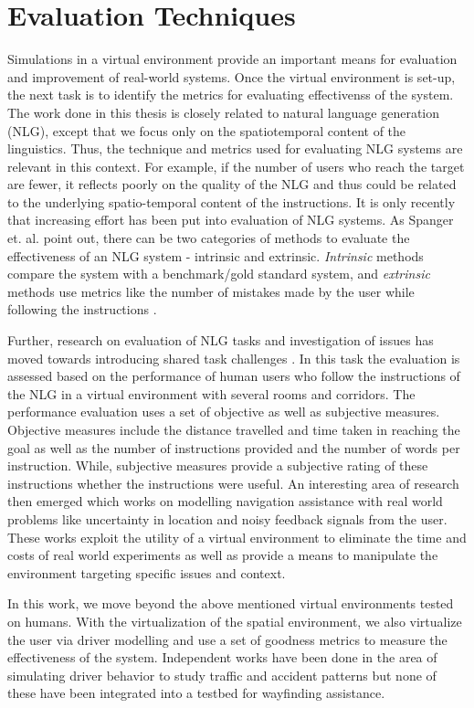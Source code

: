 \documentclass{iitkthesis}
\begin{document}
 \section{Evaluation Techniques}
Simulations in a virtual environment provide an important means for 
evaluation and improvement of real-world systems. Once the virtual 
environment is set-up, the next task is to identify the metrics for 
evaluating effectivenss of the system. The work done in this thesis is 
closely related to natural language generation (NLG), except that we focus 
only on the spatiotemporal content of the linguistics. Thus, the 
technique and metrics used for evaluating NLG systems are relevant in 
this context. For example, if the number of users who reach the target 
are fewer, it reflects poorly on the quality of the NLG and thus 
could be related to the underlying spatio-temporal content of the 
instructions. It is only recently that increasing effort has 
been put into evaluation of NLG systems. As Spanger et. al. \cite{spanger} 
point out, there can be two categories of methods to evaluate the 
effectiveness of an NLG system - intrinsic and extrinsic. \textit{
Intrinsic} methods compare the system with a benchmark/gold standard 
system, and \textit{extrinsic} methods use metrics like the number of 
mistakes made by the user while following the instructions \cite{young}. 

Further, research on evaluation of NLG tasks and investigation of issues 
has moved towards introducing shared task challenges \cite{give}. In this 
task the evaluation is assessed based on the performance of human users 
who follow the instructions of the NLG in a virtual environment with 
several rooms and corridors. The performance evaluation uses a set of 
objective as well as subjective measures. Objective measures include the 
distance travelled and time taken in reaching the goal as well as the 
number of instructions provided and the number of words per instruction. 
While, subjective measures provide a subjective rating of these 
instructions whether the instructions were useful. An interesting area of 
research \cite{GRUVE} then emerged which works on modelling navigation 
assistance with real world problems like uncertainty in location and 
noisy feedback signals from the user. These works exploit the utility of a 
virtual environment to eliminate the time and costs of real world 
experiments as well as provide a means to manipulate the environment 
targeting specific issues and context.

In this work, we move beyond the above mentioned virtual environments 
tested on humans. With the virtualization of the spatial environment, we also 
virtualize the user via driver modelling and use a set of goodness 
metrics to measure the effectiveness of the system. Independent works 
have been done in the area of simulating driver behavior to study traffic 
and accident patterns but none of these have been integrated into a 
testbed for wayfinding assistance.
\end{document}
